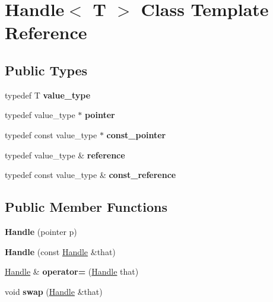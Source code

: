 \hypertarget{classHandle}{\section{\-Handle$<$ \-T $>$ \-Class \-Template \-Reference}
\label{classHandle}
}
\subsection*{\-Public \-Types}
\begin{DoxyCompactItemize}
\item 
\hypertarget{classHandle_aee908bcd2d431c03a14290e1757adb41}{typedef \-T {\bfseries value\-\_\-type}}\label{classHandle_aee908bcd2d431c03a14290e1757adb41}

\item 
\hypertarget{classHandle_ae12984dd0ac986f1395eb5f3d6be88e5}{typedef value\-\_\-type $\ast$ {\bfseries pointer}}\label{classHandle_ae12984dd0ac986f1395eb5f3d6be88e5}

\item 
\hypertarget{classHandle_a70572f1b537c269e45a4c9bb1824cbde}{typedef const value\-\_\-type $\ast$ {\bfseries const\-\_\-pointer}}\label{classHandle_a70572f1b537c269e45a4c9bb1824cbde}

\item 
\hypertarget{classHandle_a37f4011e5a2de2482f6b494fa65a82d0}{typedef value\-\_\-type \& {\bfseries reference}}\label{classHandle_a37f4011e5a2de2482f6b494fa65a82d0}

\item 
\hypertarget{classHandle_a48318242133ec8eecfadaffdd25f4e77}{typedef const value\-\_\-type \& {\bfseries const\-\_\-reference}}\label{classHandle_a48318242133ec8eecfadaffdd25f4e77}

\end{DoxyCompactItemize}
\subsection*{\-Public \-Member \-Functions}
\begin{DoxyCompactItemize}
\item 
\hypertarget{classHandle_acae37b04162b307d903b008a52b6bf95}{{\bfseries \-Handle} (pointer p)}\label{classHandle_acae37b04162b307d903b008a52b6bf95}

\item 
\hypertarget{classHandle_ad4a4e85ee6c84a4acb84f546d475b09c}{{\bfseries \-Handle} (const \hyperlink{classHandle}{\-Handle} \&that)}\label{classHandle_ad4a4e85ee6c84a4acb84f546d475b09c}

\item 
\hypertarget{classHandle_a6fb70f3c6934ed74ffdaa725fc3a54cd}{\hyperlink{classHandle}{\-Handle} \& {\bfseries operator=} (\hyperlink{classHandle}{\-Handle} that)}\label{classHandle_a6fb70f3c6934ed74ffdaa725fc3a54cd}

\item 
\hypertarget{classHandle_a48f95f0130205c87c1141e576eb2992f}{void {\bfseries swap} (\hyperlink{classHandle}{\-Handle} \&that)}\label{classHandle_a48f95f0130205c87c1141e576eb2992f}

\end{DoxyCompactItemize}
